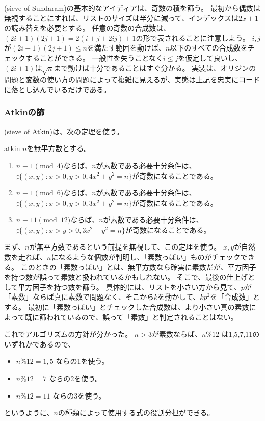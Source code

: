 (sieve of Sundaram)の基本的なアイディアは、奇数の積を篩う。
最初から偶数は無視することにすれば、リストのサイズは半分に減って、インデックスは$2x+1$の読み替えを必要とする。
任意の奇数の合成数は、$(2i+1)(2j+1)=2(i+j+2ij)+1$の形で表されることに注意しよう。
$i,j$が$(2i+1)(2j+1)\le n$を満たす範囲を動けば、$n$以下のすべての合成数をチェックすることができる。
一般性を失うことなく$i\le j$を仮定して良いし、$(2i+1)$は$\sqrt{n}$まで動けば十分であることはすぐ分かる。
実装は、オリジンの問題と変数の使い方の問題によって複雑に見えるが、実態は上記を忠実にコードに落とし込んでいるだけである。


\subsubsection{Atkinの篩}
(sieve of Atkin)\cite{atkin_sieve}は、次の定理を使う。

\begin{Theo}{}{atkin}
$n$を無平方数とする。
\begin{enumerate}
 \item $n \equiv 1\pmod{4}$ならば、$n$が素数である必要十分条件は、$\sharp\{(x,y): x>0,y>0,4x^2+y^2=n\}$が奇数になることである。
 \item $n \equiv 1\pmod{6}$ならば、$n$が素数である必要十分条件は、$\sharp\{(x,y): x>0,y>0,3x^2+y^2=n\}$が奇数になることである。
 \item $n \equiv 11\pmod{12}$ならば、$n$が素数である必要十分条件は、$\sharp\{(x,y): x>y>0,3x^2-y^2=n\}$が奇数になることである。
\end{enumerate}
\end{Theo}

まず、$n$が無平方数であるという前提を無視して、この定理を使う。
$x,y$が自然数を走れば、$n$になるような個数が判明し、「素数っぽい」ものがチェックできる。
このときの「素数っぽい」とは、無平方数なら確実に素数だが、平方因子を持つ数が誤って素数と扱われているかもしれない。
そこで、最後の仕上げとして平方因子を持つ数を篩う。
具体的には、リストを小さい方から見て、$p$が「素数」ならば真に素数で問題なく、そこから$k$を動かして、$kp^2$を「合成数」とする。
最初に「素数っぽい」とチェックした合成数は、より小さい真の素数によって既に篩われているので、誤って「素数」と判定されることはない。

これでアルゴリズムの方針が分かった。
$n>3$が素数ならば、$n \% 12$ は1,5,7,11のいずれかであるので、
\begin{itemize}
 \item $n \% 12 = 1,5$ ならの1を使う。
 \item $n \% 12 = 7$ ならの2を使う。
 \item $n \% 12 =11$ ならの3を使う。
\end{itemize}
というように、$n$の種類によって使用する式の役割分担ができる。

